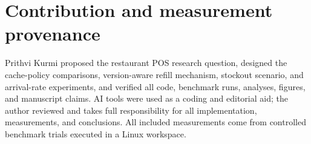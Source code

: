 \section*{Contribution and measurement provenance}

Prithvi Kurmi proposed the restaurant POS research question, designed the cache-policy comparisons, version-aware refill mechanism, stockout scenario, and arrival-rate experiments, and verified all code, benchmark runs, analyses, figures, and manuscript claims. AI tools were used as a coding and editorial aid; the author reviewed and takes full responsibility for all implementation, measurements, and conclusions. All included measurements come from controlled benchmark trials executed in a Linux workspace.
